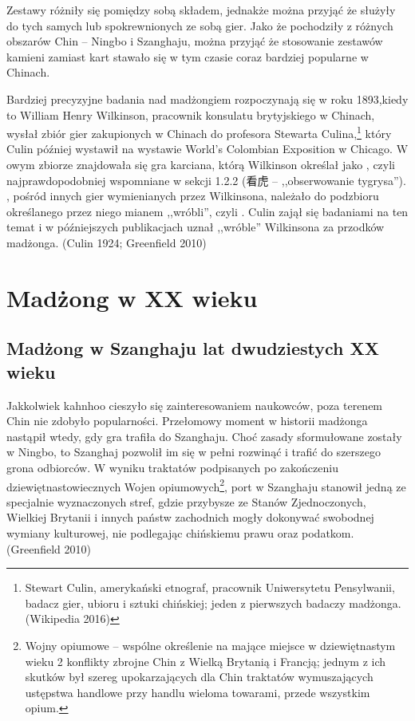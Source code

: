 Zestawy różniły się pomiędzy sobą składem, jednakże można przyjąć że służyły do
tych samych lub spokrewnionych ze sobą gier. Jako że pochodziły z różnych
obszarów Chin -- Ningbo i Szanghaju, można przyjąć że stosowanie zestawów
kamieni zamiast kart stawało się w tym czasie coraz bardziej popularne w
Chinach.

Bardziej precyzyjne badania nad madżongiem rozpoczynają się w roku 1893,kiedy to
William Henry Wilkinson, pracownik konsulatu brytyjskiego w Chinach, wysłał
zbiór gier zakupionych w Chinach do profesora Stewarta Culina,\footnote{Stewart
Culin, amerykański etnograf, pracownik Uniwersytetu Pensylwanii, badacz gier,
ubioru i sztuki chińskiej; jeden z pierwszych badaczy madżonga. (Wikipedia
2016)} który Culin później wystawił na wystawie World's Colombian Exposition w
Chicago. W owym zbiorze znajdowała się gra karciana, którą Wilkinson określał
jako , czyli najprawdopodobniej wspomniane w sekcji 1.2.2
 (看虎  -- ,,obserwowanie tygrysa'').
, pośród innych gier wymienianych przez Wilkinsona, należało do
podzbioru określanego przez niego mianem ,,wróbli'', czyli . Culin
zajął się badaniami na ten temat i w późniejszych publikacjach uznał ,,wróble''
Wilkinsona za przodków madżonga. (Culin 1924; Greenfield 2010)

\section{Madżong w XX wieku}

\subsection{Madżong w Szanghaju lat dwudziestych XX wieku}
Jakkolwiek kahnhoo cieszyło się zainteresowaniem naukowców, poza terenem Chin
nie zdobyło popularności. Przełomowy moment w historii madżonga nastąpił wtedy,
gdy gra trafiła do Szanghaju. Choć zasady sformułowane zostały w Ningbo, to
Szanghaj pozwolił im się w pełni rozwinąć i trafić do szerszego grona odbiorców.
W wyniku traktatów podpisanych po zakończeniu dziewiętnastowiecznych Wojen
opiumowych\footnote{Wojny opiumowe – wspólne określenie na mające miejsce w
dziewiętnastym wieku 2 konflikty zbrojne Chin z Wielką Brytanią i Francją;
jednym z ich skutków był szereg upokarzających dla Chin traktatów wymuszających
ustępstwa handlowe przy handlu wieloma towarami, przede wszystkim opium.}, port
w Szanghaju stanowił jedną ze specjalnie wyznaczonych stref, gdzie przybysze ze
Stanów Zjednoczonych, Wielkiej Brytanii i innych państw zachodnich mogły
dokonywać swobodnej wymiany kulturowej, nie podlegając chińskiemu prawu oraz
podatkom. (Greenfield 2010)


